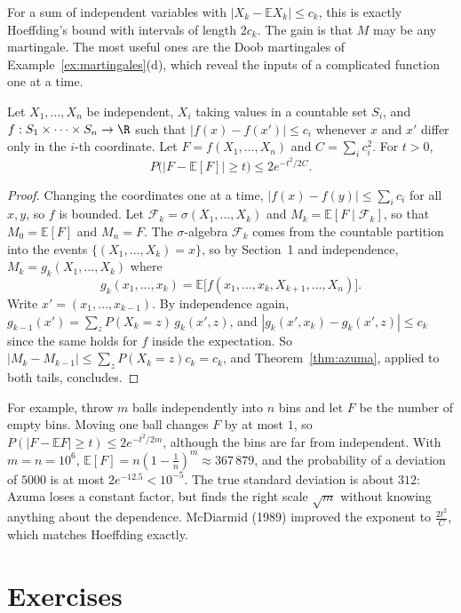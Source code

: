 For a sum of independent variables with $|X_k-\mathbb E X_k|\le c_k$, this is exactly Hoeffding's bound with intervals of length $2c_k$. The gain is that
$M$ may be any martingale. The most useful ones are the Doob martingales of Example~\ref{ex:martingales}(d), which reveal the inputs of a
complicated function one at a time.

\begin{theorem}\label{thm:bounded}
Let $X_1,\dots,X_n$ be independent, $X_i$ taking values in a countable set $S_i$, and $f:S_1\times\dots\times S_n\to\R$ such that $|f(x)-f(x')|\le c_i$ whenever $x$ and $x'$
differ only in the $i$-th coordinate. Let $F=f(X_1,\dots,X_n)$ and $C=\sum_ic_i^2$. For $t>0$,
\[
P\bigl(|F-\mathbb E[F]|\ge t\bigr)\le2e^{-t^2/2C}.
\]
\end{theorem}
\begin{proof}
Changing the coordinates one at a time, $|f(x)-f(y)|\le\sum_ic_i$ for all $x,y$, so $f$ is bounded. Let $\mathcal F_k=\sigma(X_1,\dots,X_k)$ and $M_k=\mathbb E[F\mid\mathcal F_k]$, so that
$M_0=\mathbb E[F]$ and $M_n=F$. The $\sigma$-algebra $\mathcal F_k$ comes from the countable partition into the events $\{(X_1,\dots,X_k)=x\}$, so by Section~1 and
independence, $M_k=g_k(X_1,\dots,X_k)$ where
\[
g_k(x_1,\dots,x_k)=\mathbb E\bigl[f(x_1,\dots,x_k,X_{k+1},\dots,X_n)\bigr].
\]
Write $x'=(x_1,\dots,x_{k-1})$. By independence again, $g_{k-1}(x')=\sum_zP(X_k=z)\,g_k(x',z)$, and $|g_k(x',x_k)-g_k(x',z)|\le c_k$ since the
same holds for $f$ inside the expectation. So $|M_k-M_{k-1}|\le\sum_zP(X_k=z)c_k=c_k$, and Theorem~\ref{thm:azuma}, applied to both tails, concludes.
\end{proof}

For example, throw $m$ balls independently into $n$ bins and let $F$ be the number of empty bins. Moving one ball changes $F$ by at most
$1$, so $P(|F-\mathbb E F|\ge t)\le2e^{-t^2/2m}$, although the bins are far from independent. With $m=n=10^6$, $\mathbb E[F]=n(1-\frac1n)^m\approx367\,879$, and the
probability of a deviation of $5000$ is at most $2e^{-12.5}<10^{-5}$. The true standard deviation is about $312$: Azuma loses a constant
factor, but finds the right scale $\sqrt m$ without knowing anything about the dependence. McDiarmid (1989) improved the exponent to
$\frac{2t^2}C$, which matches Hoeffding exactly.

\section{Exercises}

